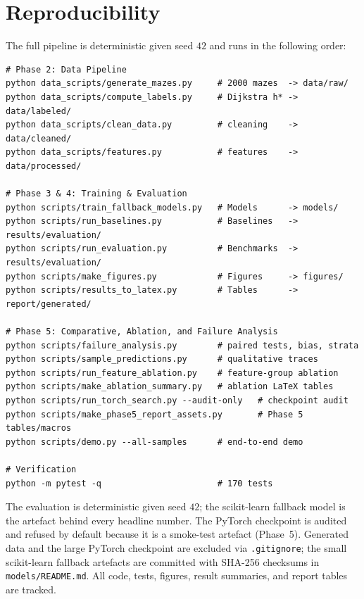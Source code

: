 \documentclass[11pt]{article}
\begin{document}
\section{Reproducibility}
The full pipeline is deterministic given seed $42$ and runs in the following order:

\begin{verbatim}
# Phase 2: Data Pipeline
python data_scripts/generate_mazes.py     # 2000 mazes  -> data/raw/
python data_scripts/compute_labels.py     # Dijkstra h* -> data/labeled/
python data_scripts/clean_data.py         # cleaning    -> data/cleaned/
python data_scripts/features.py           # features    -> data/processed/

# Phase 3 & 4: Training & Evaluation
python scripts/train_fallback_models.py   # Models      -> models/
python scripts/run_baselines.py           # Baselines   -> results/evaluation/
python scripts/run_evaluation.py          # Benchmarks  -> results/evaluation/
python scripts/make_figures.py            # Figures     -> figures/
python scripts/results_to_latex.py        # Tables      -> report/generated/

# Phase 5: Comparative, Ablation, and Failure Analysis
python scripts/failure_analysis.py        # paired tests, bias, strata
python scripts/sample_predictions.py      # qualitative traces
python scripts/run_feature_ablation.py    # feature-group ablation
python scripts/make_ablation_summary.py   # ablation LaTeX tables
python scripts/run_torch_search.py --audit-only   # checkpoint audit
python scripts/make_phase5_report_assets.py       # Phase 5 tables/macros
python scripts/demo.py --all-samples      # end-to-end demo

# Verification
python -m pytest -q                       # 170 tests
\end{verbatim}

The evaluation is deterministic given seed $42$; the scikit-learn fallback model is the
artefact behind every headline number. The PyTorch checkpoint is audited and refused by
default because it is a smoke-test artefact (Phase~5). Generated data and the large
PyTorch checkpoint are excluded via \texttt{.gitignore}; the small scikit-learn
fallback artefacts are committed with SHA-256 checksums in \texttt{models/README.md}.
All code, tests, figures, result summaries, and report tables are tracked.
\end{document}
